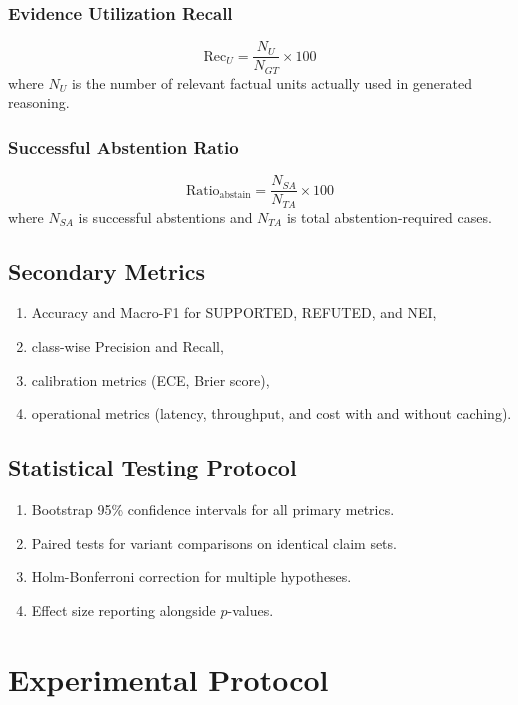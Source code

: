 \documentclass[12pt,a4paper,oneside]{report}
\begin{document}
\subsection{Evidence Utilization Recall}
\begin{equation}
\mathrm{Rec}_{U} = \frac{N_U}{N_{GT}}\times 100
\label{eq:recu}
\end{equation}
where $N_U$ is the number of relevant factual units actually used in generated reasoning.

\subsection{Successful Abstention Ratio}
\begin{equation}
\mathrm{Ratio}_{\mathrm{abstain}} = \frac{N_{SA}}{N_{TA}}\times 100
\label{eq:abstain}
\end{equation}
where $N_{SA}$ is successful abstentions and $N_{TA}$ is total abstention-required cases.

\section{Secondary Metrics}
\begin{enumerate}
  \item Accuracy and Macro-F1 for SUPPORTED, REFUTED, and NEI,
  \item class-wise Precision and Recall,
  \item calibration metrics (ECE, Brier score),
  \item operational metrics (latency, throughput, and cost with and without caching).
\end{enumerate}

\section{Statistical Testing Protocol}
\begin{enumerate}
  \item Bootstrap 95\% confidence intervals for all primary metrics.
  \item Paired tests for variant comparisons on identical claim sets.
  \item Holm-Bonferroni correction for multiple hypotheses.
  \item Effect size reporting alongside $p$-values.
\end{enumerate}

\chapter{Experimental Protocol}
\label{chap:protocol}
\end{document}

